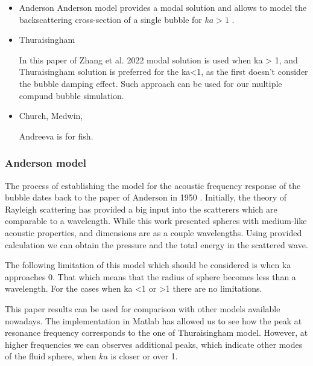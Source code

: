 \begin{itemize}
    \item Anderson
    Anderson model provides a modal solution and allows to model the backscattering cross-section of a single bubble for $ka > 1$ \cite{anderson_sound_2005}.

    \item Thuraisingham

    In this paper of Zhang et al. 2022 \cite{zhang_efficient_2022} modal solution is used when ka > 1, and Thuraisingham solution is preferred for the ka<1, as the first doesn't consider the bubble damping effect.  Such approach can be used for our multiple compund bubble simulation.

    \item Church, Medwin,

    Andreeva is for fish.

\end{itemize}

\subsubsection{Anderson model}
The process of establishing the model for the acoustic frequency response of the bubble dates back to the paper of Anderson in 1950 \cite{anderson_sound_2005}. Initially, the theory of Rayleigh scattering has provided a big input into the scatterers which are comparable to a wavelength. While this work presented spheres with medium-like acoustic properties, and dimensions are as a couple  wavelengths. Using provided calculation we can obtain the pressure and the total energy in the scattered wave.

The following limitation of this model which should be considered is when ka approaches 0. That which means that the radius of sphere becomes less than a wavelength. For the cases when ka <1 or >1 there are no limitations.

This paper results can be used for comparison with other models available nowadays. The implementation in Matlab has allowed us to see how the peak at resonance frequency corresponds to the one of Thuraisingham model. However, at higher frequencies we can observes additional peaks, which indicate other modes of the fluid sphere, when $ka$ is closer or over 1.

